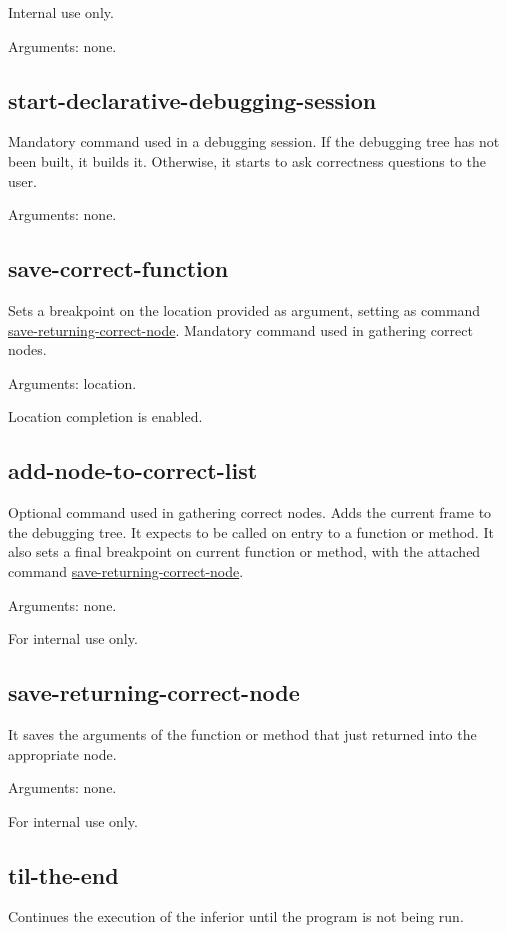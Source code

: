 Internal use only.

Arguments: none.
\subsection{start-declarative-debugging-session}
\label{command:start-declarative-debugging-session}
Mandatory command used in a debugging session.
If the debugging tree has not been built, it builds it. Otherwise, it starts to ask correctness questions to the user. 

Arguments: none.
\subsection{save-correct-function}
\label{command:save-correct-function}
Sets a breakpoint on the location provided as argument, setting as command \hyperref[command:save-returning-correct-node]{save-returning-correct-node}. Mandatory command used in gathering correct nodes.

Arguments: location.

Location completion is enabled.
\subsection{add-node-to-correct-list}
\label{command:add-node-to-correct-list}
Optional command used in gathering correct nodes.
Adds the current frame to the debugging tree.
It expects to be called on entry to a function or method.
It also sets a final breakpoint on current function or method, with the attached command \hyperref[command:save-returning-correct-node]{save-returning-correct-node}.

Arguments: none.

For internal use only.
\subsection{save-returning-correct-node}
\label{command:save-returning-correct-node}
It saves the arguments of the function or method that just returned into the appropriate node.

Arguments: none.

For internal use only.
\subsection{til-the-end}
\label{command:til-the-end}
Continues the execution of the inferior until the program is not being run.

